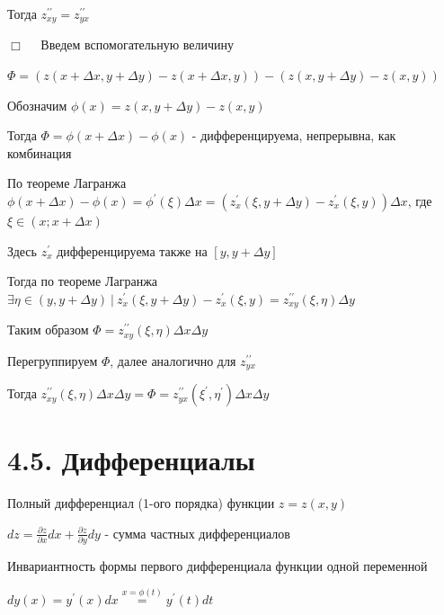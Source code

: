 \documentclass[12pt]{article}
\begin{document}
    Тогда $\displaystyle z^{\prime\prime}_{xy} = z^{\prime\prime}_{yx}$

    $\displaystyle \Box \quad$ Введем вспомогательную величину

    $\displaystyle \Phi = (z(x + \Delta x, y + \Delta y) - z(x + \Delta x, y)) - (z(x, y + \Delta y) - z(x, y))$

    Обозначим $\displaystyle \phi(x) = z(x, y + \Delta y) - z(x, y)$

    Тогда $\displaystyle \Phi = \phi(x + \Delta x) - \phi(x)$ - дифференцируема, непрерывна, как комбинация

    По теореме Лагранжа $\displaystyle \phi(x + \Delta x) - \phi(x) = \phi^\prime(\xi) \Delta x = (z^\prime_x(\xi, y + \Delta y) - z^\prime_x(\xi, y)) \Delta x$, где $\displaystyle \xi \in (x; x + \Delta x)$

    Здесь $\displaystyle z^\prime_x$ дифференцируема также на $\displaystyle [y, y + \Delta y]$


    Тогда по теореме Лагранжа $\displaystyle \exists \eta \in (y, y + \Delta y) \ | \ z^\prime_x(\xi, y + \Delta y) - z^\prime_x(\xi, y) = z^{\prime\prime}_{xy} (\xi, \eta) \Delta y$

    Таким образом $\displaystyle \Phi = z^{\prime\prime}_{xy} (\xi, \eta) \Delta x \Delta y$

    Перегруппируем $\displaystyle \Phi$, далее аналогично для $\displaystyle z^{\prime\prime}_{yx}$

    Тогда $\displaystyle z^{\prime\prime}_{xy} (\xi, \eta) \Delta x \Delta y = \Phi = z^{\prime\prime}_{yx} (\xi^\prime, \eta^\prime) \Delta x \Delta y$

    \vspace{8mm}

    \section{4.5. Дифференциалы}
    
    \hypertarget{completedifferentialoffunctionoftwovariables}{}
     Полный дифференциал (1-ого порядка) функции $\displaystyle z = z(x, y)$

    $\displaystyle dz = \frac{\partial z}{\partial x} dx + \frac{\partial z}{\partial y} dy$ - сумма частных дифференциалов

     Инвариантность формы первого дифференциала функции одной переменной

    $\displaystyle dy(x) = y^\prime(x)dx \stackrel{x = \phi(t)}{=} y^\prime(t)dt$
\end{document}
